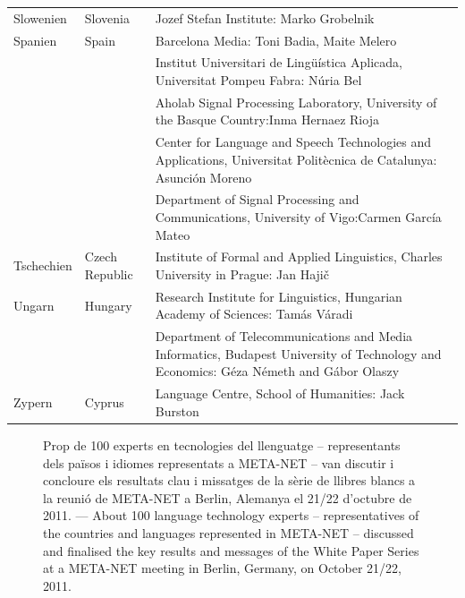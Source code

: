 \begin{longtable}{@{}llp{113mm}@{}}
  Slowenien & \textcolor{grey1}{Slovenia} & Jozef Stefan Institute: Marko Grobelnik \\ \addlinespace 
  Spanien & \textcolor{grey1}{Spain} & Barcelona Media: Toni Badia, Maite Melero \\ \addlinespace 
  & & Institut Universitari de Lingüística Aplicada, Universitat Pompeu Fabra: Núria Bel \\ \addlinespace 
  & & Aholab Signal Processing Laboratory, University of the Basque Country:\newline Inma Hernaez Rioja \\ \addlinespace 
  & & Center for Language and Speech Technologies and Applications, Universitat Politècnica de Catalunya:  Asunción Moreno \\ \addlinespace 
  & & Department of Signal Processing and Communications, University of Vigo:\newline Carmen García Mateo \\ \addlinespace 
  Tschechien & \textcolor{grey1}{Czech Republic} & Institute of Formal and Applied Linguistics, Charles University in Prague: Jan Hajič \\ \addlinespace
  Ungarn & \textcolor{grey1}{Hungary} & Research Institute for Linguistics, Hungarian Academy of Sciences: Tamás Váradi\\  \addlinespace
  & & Department of Telecommunications and Media Informatics, Budapest University of Technology and Economics: Géza Németh and Gábor Olaszy\\ \addlinespace
  Zypern & \textcolor{grey1}{Cyprus} & Language Centre, School of Humanities: Jack Burston
\end{longtable}
\normalsize

\renewcommand*{\figureformat}{}
\renewcommand*{\captionformat}{}

\begin{figure}[htbp]
  \center
  \caption{Prop de 100 experts en tecnologies del llenguatge -- representants dels països i idiomes representats a META-NET --  van discutir i concloure els resultats clau i missatges de la sèrie de llibres blancs a la reunió de META-NET a Berlin, Alemanya el 21/22 d'octubre de 2011. ---
 \textcolor{grey1}{About 100 language technology experts -- representatives of the countries and languages represented in META-NET -- discussed and finalised the key results and messages of the White Paper Series at a META-NET meeting in Berlin, Germany, on October 21/22, 2011.}}
  \medskip
\end{figure}

